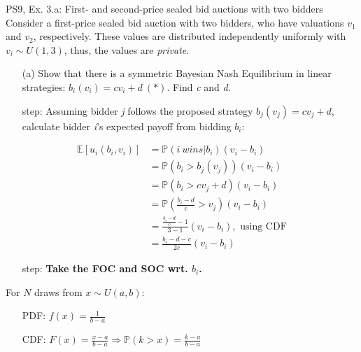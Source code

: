\begin{frame}{PS9, Ex. 3.a: First- and second-price sealed bid auctions with two bidders}
    Consider a first-price sealed bid auction with two bidders, who have valuations $v_1$ and $v_2$, respectively. These values are distributed independently uniformly with $v_i\sim U(1,3)$, thus, the values are \textit{private}.
    \vspace{-4pt}
    \begin{itemize}
      \item[(a)] Show that there is a symmetric Bayesian Nash Equilibrium in linear strategies: $b_i(v_i) = cv_i + d\ (*)$. Find \textit{c} and \textit{d}.
    \end{itemize}
    \vspace{-8pt}
    \begin{multicols}{2}
      \begin{itemize}
        \item[\nth{1} step:] Assuming bidder \textit{j} follows the proposed strategy $b_j(v_j) = cv_j + d$, calculate bidder \textit{i}'s expected payoff from bidding $b_i$:
      \end{itemize}
      \vspace{-4pt}
      \begin{align*}
        \mathbb{E}[u_i(b_i,v_i)]&=\mathbb{P}(i\ wins|b_i)(v_i-b_i)\\
                                &=\mathbb{P}(b_i>b_j(v_j))(v_i-b_i)\\
                                &=\mathbb{P}(b_i>cv_j+d)(v_i-b_i)\\
                                &=\mathbb{P}\left(\frac{b_i-d}{c}>v_j\right)(v_i-b_i)\\
                                &=\frac{\frac{b_i-d}{c}-1}{3-1}(v_i-b_i),\text{ using CDF}\\
                                &=\frac{b_i-d-c}{2c}(v_i-b_i)
      \end{align*}
      \vspace{-10pt}
      \begin{itemize}
        \item[\nth{2} step:] \textbf{Take the FOC and SOC wrt. $b_i$.}
      \end{itemize}
      \vfill\null\columnbreak
      For $N$ draws from $x\sim U(a, b):$
      \vspace{-6pt}
      \begin{enumerate}
        \item[PDF:] $f(x)=\frac{1}{b-a}$
        \item[CDF:] $F(x)=\frac{x-a}{b-a}\Rightarrow\mathbb{P}(k>x)=\frac{k-a}{b-a}$

\end{enumerate}
\end{multicols}
\end{frame}
